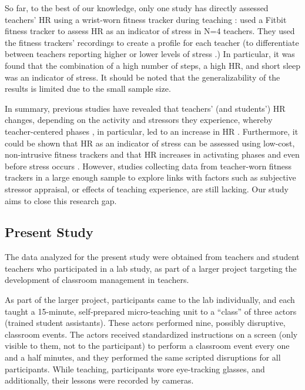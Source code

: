 \documentclass[]{elsarticle} %
\begin{document}
So far, to the best of our knowledge, only one study has directly
assessed teachers' HR using a wrist-worn fitness tracker during teaching
: \citet{runge2020} used a Fitbit fitness tracker to assess HR as an
indicator of stress in N=4 teachers. They used the fitness trackers'
recordings to create a profile for each teacher (to differentiate
between teachers reporting higher or lower levels of stress .) In
particular, it was found that the combination of a high number of steps,
a high HR, and short sleep was an indicator of stress. It should be
noted that the generalizability of the results is limited due to the
small sample size.

In summary, previous studies have revealed that teachers' (and
students') HR changes, depending on the activity and stressors they
experience, whereby teacher-centered phases , in particular, led to an
increase in HR
\citep{sperka1995, scheuch1997psychophysische, donker2018, junker2021}.
Furthermore, it could be shown that HR as an indicator of stress can be
assessed using low-cost, non-intrusive fitness trackers and that HR
increases in activating phases and even before stress occurs
\citep{Darnell2019, chalmers2021}. However, studies collecting data from
teacher-worn fitness trackers in a large enough sample to explore links
with factors such as subjective stressor appraisal, or effects of
teaching experience, are still lacking. Our study aims to close this
research gap.

\hypertarget{present-study}{%
\subsection{Present Study}\label{present-study}}

The data analyzed for the present study were obtained from teachers and
student teachers who participated in a lab study, as part of a larger
project targeting the development of classroom management in teachers.

As part of the larger project, participants came to the lab
individually, and each taught a 15-minute, self-prepared micro-teaching
unit to a ``class'' of three actors (trained student assistants). These
actors performed nine, possibly disruptive, classroom events. The actors
received standardized instructions on a screen (only visible to them,
not to the participant) to perform a classroom event every one and a
half minutes, and they performed the same scripted disruptions for all
participants. While teaching, participants wore eye-tracking glasses,
and additionally, their lessons were recorded by cameras.
\end{document}
